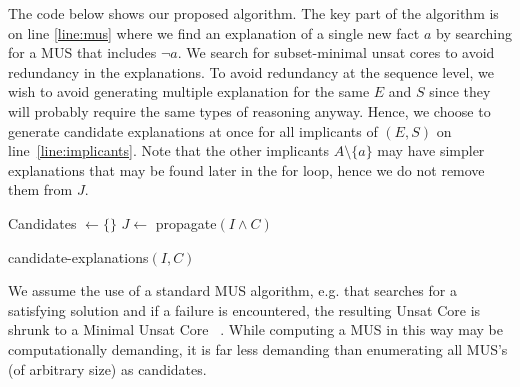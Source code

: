 The code below shows our proposed algorithm. The key part of the algorithm is on line \ref{line:mus} where we find an explanation of a single new fact $a$ by searching for a MUS that includes $\neg a$.
We search for subset-minimal unsat cores to avoid redundancy in the explanations. To avoid redundancy at the sequence level, we wish to avoid generating multiple explanation for the same $E$ and $S$ since they will probably require the same types of reasoning anyway. Hence, we choose to generate candidate explanations at once for all implicants of $(E, S)$ on line~\ref{line:implicants}. Note that the other implicants $A \setminus \{a\}$ may have simpler explanations that may be found later in the for loop, hence we do not remove them from $J$.

\begin{algorithm}
% 

% 

  Candidates $\gets \{\}$\;
  $J \gets$ propagate$(I \wedge C)$\;
\caption{candidate-explanations$(I,C)$}

\label{alg:cand}
\end{algorithm}


We assume the use of a standard MUS algorithm, e.g. that searches for a satisfying solution and if a failure is encountered, the resulting Unsat Core is shrunk to a Minimal Unsat Core~\cite{} . While computing a MUS in this way may be computationally demanding, it is far less demanding than enumerating all MUS's (of arbitrary size) as candidates. 



